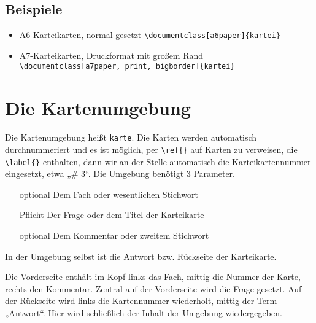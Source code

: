 \documentclass[a4paper]{article}
\begin{document}
\subsection{Beispiele}
\begin{itemize}
	\item A6-Karteikarten, normal gesetzt \lstinline!\documentclass[a6paper]{kartei}!
	\item A7-Karteikarten, Druckformat mit großem Rand\\ \lstinline!\documentclass[a7paper, print, bigborder]{kartei}!
\end{itemize}
%
%
%
\section{Die Kartenumgebung}
Die Kartenumgebung heißt \lstinline!karte!. Die Karten werden automatisch durchnummeriert und es ist möglich, per \lstinline!\ref{}! auf Karten zu verweisen, die \lstinline!\label{}! enthalten, dann wir an der Stelle automatisch die Karteikartennummer eingesetzt, etwa „\# 3“. Die Umgebung benötigt 3 Parameter.
\begin{enumerate}
	\item[optional] Dem Fach oder wesentlichen Stichwort
	\item[Pflicht] Der Frage oder dem Titel der Karteikarte
	\item[optional] Dem Kommentar oder zweitem Stichwort
\end{enumerate}
In der Umgebung selbst ist die Antwort bzw. Rückseite der Karteikarte.

Die Vorderseite enthält im Kopf links das Fach, mittig die Nummer der Karte, rechts den Kommentar. Zentral auf der Vorderseite wird die Frage gesetzt. Auf der Rückseite wird links die Kartennummer wiederholt, mittig der Term „Antwort“. Hier wird schließlich der Inhalt der Umgebung wiedergegeben.
\end{document}

